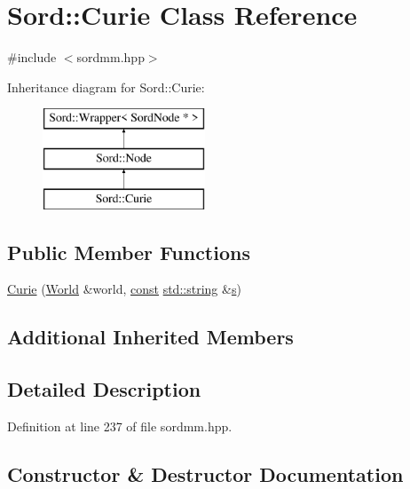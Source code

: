 \hypertarget{class_sord_1_1_curie}{}\section{Sord\+:\+:Curie Class Reference}
\label{class_sord_1_1_curie}


{\ttfamily \#include $<$sordmm.\+hpp$>$}

Inheritance diagram for Sord\+:\+:Curie\+:\begin{figure}[H]
\begin{center}
\leavevmode
\includegraphics[height=3.000000cm]{class_sord_1_1_curie}
\end{center}
\end{figure}
\subsection*{Public Member Functions}
\begin{DoxyCompactItemize}
\item 
\hyperlink{class_sord_1_1_curie_a36c07bd587427e8e2d137a244b21aa0a}{Curie} (\hyperlink{class_sord_1_1_world}{World} \&world, \hyperlink{getopt1_8c_a2c212835823e3c54a8ab6d95c652660e}{const} \hyperlink{test__lib_f_l_a_c_2format_8c_ab02026ad0de9fb6c1b4233deb0a00c75}{std\+::string} \&\hyperlink{lib_2expat_8h_a755339d27872b13735c2cab829e47157}{s})
\end{DoxyCompactItemize}
\subsection*{Additional Inherited Members}


\subsection{Detailed Description}


Definition at line 237 of file sordmm.\+hpp.



\subsection{Constructor \& Destructor Documentation}
